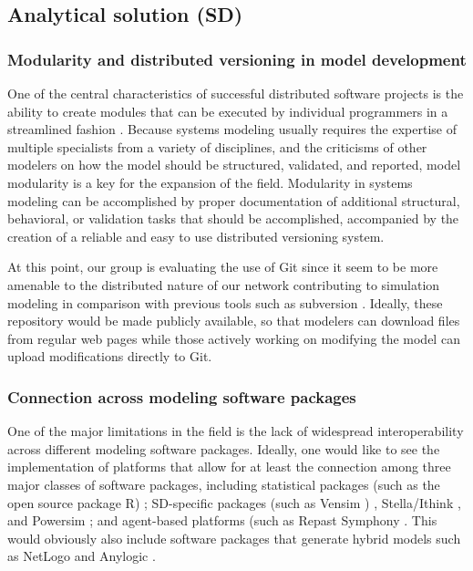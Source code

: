 \documentclass[11pt]{article}
\begin{document}
\subsection {Analytical solution (SD)}
\subsubsection {Modularity and distributed versioning in model development}
One of the central characteristics of successful distributed software projects is the ability to create modules that can be executed by individual programmers in a streamlined fashion \cite{Moon2000}.  Because systems modeling usually requires the expertise of multiple specialists from a variety of disciplines, and the criticisms of other modelers on how the model should be structured, validated, and reported, model modularity is a key for the expansion of the field.  Modularity in systems modeling can be accomplished by proper documentation of additional structural, behavioral, or validation tasks that should be accomplished, accompanied by the creation of a reliable and easy to use distributed versioning system.

At this point, our group is evaluating the use of Git \cite{GITCHACON2009} since it seem to be more amenable to the distributed nature of our network \cite{git} contributing to simulation modeling in comparison with previous tools such as subversion \cite{subversion}.  Ideally, these repository would be made publicly available, so that modelers can download files from regular web pages while those actively working on modifying the model can upload modifications directly to Git.

\subsubsection {Connection across modeling software packages}
One of the major limitations in the field is the lack of widespread interoperability across different modeling software packages.  Ideally, one would like to see the implementation of platforms that allow for at least the connection among three major classes of software packages, including statistical packages (such as the open source package R) \cite{r-project}; SD-specific packages (such as Vensim \cite{vensim}) , Stella/Ithink \cite{iseesystems} , and Powersim \cite{powersim}; and agent-based platforms (such as Repast Symphony \cite{repast}.  This would obviously also include software packages that generate hybrid models such as NetLogo \cite{netlogo} and Anylogic \cite{anylogic}.
\end{document}
